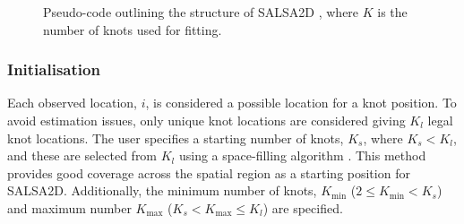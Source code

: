 \documentclass[letterpaper]{interact}
\begin{document}
\begin{figure}[!htb]
\vspace{1cm}

\label{fig:salsaAlg}
\caption{Pseudo-code outlining the structure of SALSA2D \cite[adapted from Figure 1,][]{Walk2010}, where $K$ is the number of knots used for fitting.}
\end{figure}

 

\subsubsection{Initialisation}\label{initialisation}

Each observed location, \(i\), is considered a possible location for a knot position. To avoid estimation issues, only unique knot locations are considered giving \(K_l\) legal knot locations. The user specifies a starting number of knots, \(K_s\), where \(K_s<K_l\), and these are selected from \(K_l\) using a space-filling algorithm \cite{Johnson1990}. This method provides good coverage across the spatial region as a starting position for SALSA2D. Additionally, the minimum number of knots, \(K_{\textrm{min}}\) (\(2\leq K_{\textrm{min}}<K_s\)) and maximum number \(K_{\textrm{max}}\) (\(K_s< K_{\textrm{max}}\leq K_l\)) are specified.
\end{document}
